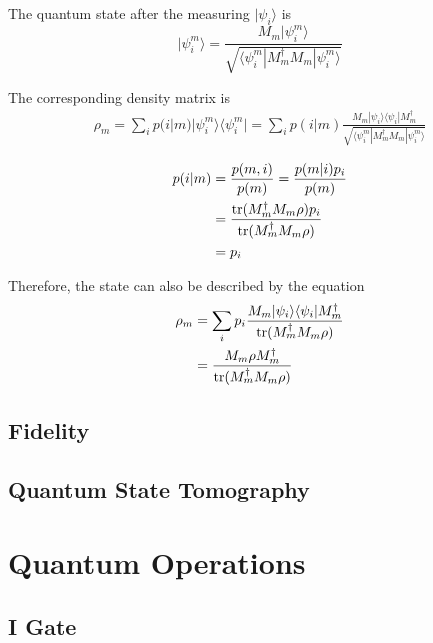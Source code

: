 The quantum state after the measuring $|\psi_i\rangle$ is 
\begin{equation}
  |\psi^m_i\rangle = \frac{M_m|\psi^m_i\rangle}{\sqrt{\langle \psi^m_i|M^{\dagger}_m M_m|\psi^m_i\rangle}}
\end{equation}

The corresponding density matrix is
\begin{equation}
  \begin{split}
    \rho_m = \sum_i p(i|m)|\psi^m_i\rangle\langle\psi^m_i| = \sum_i p(i|m)\frac{M_m|\psi_i\rangle\langle\psi_i|M^{\dagger}_m}{\sqrt{\langle \psi^m_i|M^{\dagger}_m M_m|\psi^m_i\rangle}}
  \end{split}
\end{equation}

\begin{equation}
  \begin{split}
    p(i|m) &= \frac{p(m, i)}{p(m)} = \frac{p(m|i)p_i}{p(m)} \\
    &= \frac{\operatorname{tr}(M^{\dagger}_m M_m \rho) p_i}{\operatorname{tr}(M^{\dagger}_m M_m \rho)} \\
    &= p_i
  \end{split}
\end{equation}

Therefore, the state can also be described by the equation
\begin{equation}
  \begin{split}
    \rho_m &= \sum_i p_i \frac{M_m|\psi_i\rangle\langle\psi_i|M^{\dagger}_m}{\operatorname{tr}(M^{\dagger}_m M_m \rho)} \\
    &= \frac{M_m \rho M^{\dagger}_m}{\operatorname{tr}(M^{\dagger}_m M_m \rho)}
  \end{split}
\end{equation}

 \subsection{Fidelity}
 \subsection{Quantum State Tomography}

\section{Quantum Operations}
\subsection{I Gate}

